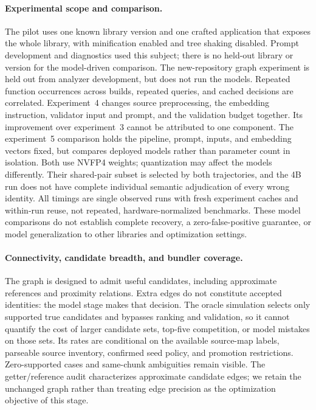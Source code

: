 \paragraph{Experimental scope and comparison.}
The pilot uses one known library version and one crafted application that exposes the whole library, with minification enabled and tree shaking disabled. Prompt development and diagnostics used this subject; there is no held-out library or version for the model-driven comparison. The new-repository graph experiment is held out from analyzer development, but does not run the models. Repeated function occurrences across builds, repeated queries, and cached decisions are correlated. Experiment~4 changes source preprocessing, the embedding instruction, validator input and prompt, and the validation budget together. Its improvement over experiment~3 cannot be attributed to one component. The experiment~5 comparison holds the pipeline, prompt, inputs, and embedding vectors fixed, but compares deployed models rather than parameter count in isolation. Both use NVFP4 weights; quantization may affect the models differently. Their shared-pair subset is selected by both trajectories, and the 4B run does not have complete individual semantic adjudication of every wrong identity. All timings are single observed runs with fresh experiment caches and within-run reuse, not repeated, hardware-normalized benchmarks. These model comparisons do not establish complete recovery, a zero-false-positive guarantee, or model generalization to other libraries and optimization settings.

\paragraph{Connectivity, candidate breadth, and bundler coverage.}
The graph is designed to admit useful candidates, including approximate references and proximity relations. Extra edges do not constitute accepted identities: the model stage makes that decision. The oracle simulation selects only supported true candidates and bypasses ranking and validation, so it cannot quantify the cost of larger candidate sets, top-five competition, or model mistakes on those sets. Its rates are conditional on the available source-map labels, parseable source inventory, confirmed seed policy, and promotion restrictions. Zero-supported cases and same-chunk ambiguities remain visible. The getter/reference audit characterizes approximate candidate edges; we retain the unchanged graph rather than treating edge precision as the optimization objective of this stage.

